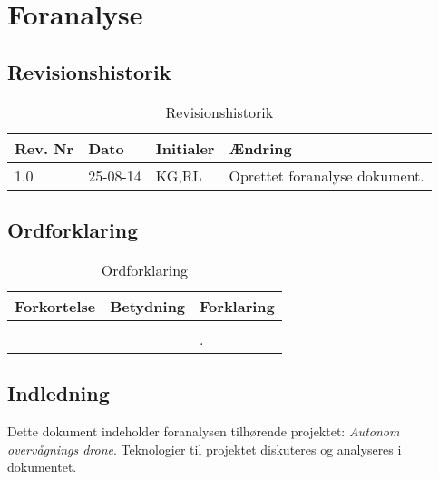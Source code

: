 \chapter{Foranalyse}

\section{Revisionshistorik}
\begin{table}[H]
	\centering
		\begin{tabular}{|p{2 cm}|p{2 cm}|p{3 cm}|p{6 cm}|} 
		\hline
			\textbf{Rev. Nr} & \textbf{Dato}		& \textbf{Initialer} 	& \textbf{Ændring} \\ \hline
			1.0 	& 25-08-14	& KG,RL		& Oprettet foranalyse dokument.	\\ \hline
		\end{tabular}
	\caption{Revisionshistorik}
\end{table}

\vspace{1.5cm}

\section{Ordforklaring}
\begin{table}[H]
	\centering
		\begin{tabular}{|p{2.5cm}|p{4.5 cm}|p{6.5 cm}|} 
		\hline
			\textbf{Forkortelse} & \textbf{Betydning} & \textbf{Forklaring} \\ \hline
			 &  &  \\ \hline
			 &  &. \\ \hline
		\end{tabular}
	\caption{Ordforklaring}
\end{table}

\vspace{2cm}

\section{Indledning}

Dette dokument indeholder foranalysen tilhørende projektet: \textit{Autonom overvågnings drone}. Teknologier til projektet diskuteres og analyseres i dokumentet.